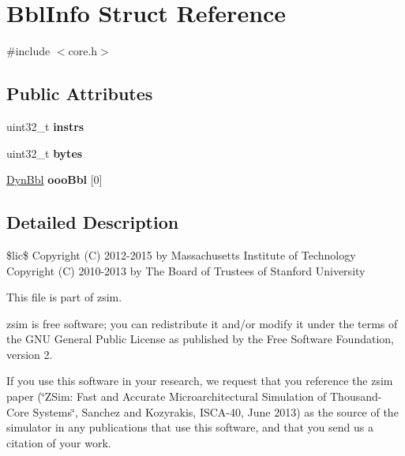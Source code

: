 \hypertarget{structBblInfo}{\section{Bbl\-Info Struct Reference}
\label{structBblInfo}
}


{\ttfamily \#include $<$core.\-h$>$}

\subsection*{Public Attributes}
\begin{DoxyCompactItemize}
\item 
\hypertarget{structBblInfo_a26381f3642e0d5511b7173d734e0a88d}{uint32\-\_\-t {\bfseries instrs}}\label{structBblInfo_a26381f3642e0d5511b7173d734e0a88d}

\item 
\hypertarget{structBblInfo_ae13e66a8604c69c30d5510b417f49908}{uint32\-\_\-t {\bfseries bytes}}\label{structBblInfo_ae13e66a8604c69c30d5510b417f49908}

\item 
\hypertarget{structBblInfo_a27991de4233c2f89706a5abd21157664}{\hyperlink{structDynBbl}{Dyn\-Bbl} {\bfseries ooo\-Bbl} \mbox{[}0\mbox{]}}\label{structBblInfo_a27991de4233c2f89706a5abd21157664}

\end{DoxyCompactItemize}


\subsection{Detailed Description}
\$lic\$ Copyright (C) 2012-\/2015 by Massachusetts Institute of Technology Copyright (C) 2010-\/2013 by The Board of Trustees of Stanford University

This file is part of zsim.

zsim is free software; you can redistribute it and/or modify it under the terms of the G\-N\-U General Public License as published by the Free Software Foundation, version 2.

If you use this software in your research, we request that you reference the zsim paper (\char`\"{}\-Z\-Sim\-: Fast and Accurate Microarchitectural Simulation of
\-Thousand-\/\-Core Systems\char`\"{}, Sanchez and Kozyrakis, I\-S\-C\-A-\/40, June 2013) as the source of the simulator in any publications that use this software, and that you send us a citation of your work.

